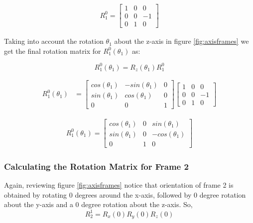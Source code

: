 \documentclass[a4paper, titlepage]{article}
\begin{document}
\begin{equation}
\begin{split}
R^0_{1} = 
\begin{bmatrix}
1 & 0 & 0 \\ 0 & 0 & -1 \\ 0 & 1 & 0 
\end{bmatrix}
\end{split}
\end{equation}

Taking into account the rotation $\theta_{1}$ about the z-axis in figure \ref{fig:axisframes} we get the final rotation matrix for $R^0_{1}(\theta_{1})$ as:

\begin{equation}
R^0_{1}(\theta_{1}) = R_{z}(\theta_{1})R^0_{1}
\end{equation}

\begin{equation}
\begin{split}
R^0_{1}(\theta_{1})
&=
\begin{bmatrix}
cos(\theta_{1}) & -sin(\theta_{1}) & 0 \\ sin(\theta_{1}) & cos(\theta_{1}) & 0 \\ 0 & 0 & 1
\end{bmatrix}
\begin{bmatrix}
1 & 0 & 0 \\ 0 & 0 & -1 \\ 0 & 1 & 0 
\end{bmatrix}
\end{split}
\end{equation}


\begin{equation}
\begin{split}
R^0_{1}(\theta_{1}) = 
\begin{bmatrix}
cos(\theta_{1}) & 0 & sin(\theta_{1})  \\ 
sin(\theta_{1}) & 0 & -cos(\theta_{1})  \\ 
0 & 1 & 0
\end{bmatrix}
\end{split}
\label{equ:r01}
\end{equation}

\subsubsection{Calculating the Rotation Matrix for Frame 2}

Again, reviewing figure \ref{fig:axisframes} notice that orientation of frame 2 is obtained by rotating 0 degrees around the x-axis, followed by 0 degree rotation about the y-axis and a 0 degree rotation about the z-axis. So, 
\begin{equation}
R^1_{2} = R_{x}(0)R_{y}(0)R_{z}(0)
\end{equation}
\end{document}
